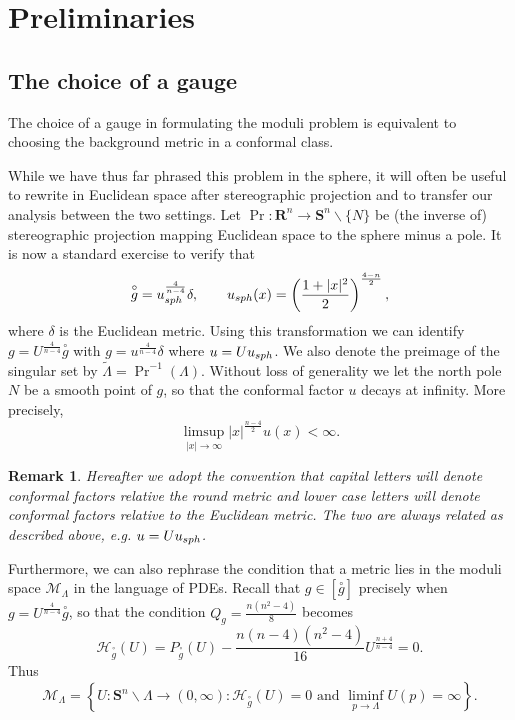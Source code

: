 \documentclass[reqno,11pt]{amsart}
\newtheorem{remark}[theorem]{Remark}
\theoremstyle{tttheorem}
\newcommand{\Ss}{\mathbf{S}}
\newcommand{\R}{\mathbf{R}}
\begin{document}
\section{Preliminaries} \label{sec:prelim} 

\subsection{The choice of a gauge} \label{sec:reformulations} 

The choice of a gauge in formulating the moduli problem is 
equivalent to choosing the background metric in a conformal 
class. 

While we have thus far phrased this problem in the sphere, it will 
often be useful to rewrite in Euclidean space after stereographic 
projection and to transfer our analysis between the two settings. 
Let $\operatorname{Pr}: \R^n \rightarrow \Ss^n \backslash \{ N \}$ 
be (the inverse of) stereographic projection mapping Euclidean space 
to the sphere minus a pole. It is now a standard exercise to verify 
that 
$$\overset{\circ}{g} = u_{\rm sph}^{\frac{4}{n-4}} \delta, \qquad 
u_{\rm sph} (x) = \left ( \frac{1+|x|^2}{2} \right )^{\frac{4-n}{2}}, $$
where $\delta$ is the Euclidean metric. Using this transformation we can 
identify $g = U^{\frac{4}{n-4}} \overset{\circ}{g}$ with $g= u^{\frac{4}{n-4}} \delta$
where $u = U u_{\rm sph}$. We also denote the preimage of the singular 
set by $\widetilde \Lambda = \operatorname{Pr}^{-1} (\Lambda)$. Without 
loss of generality we let the north pole $N$ be a smooth point of $g$, 
so that the conformal factor $u$ decays at infinity. More precisely, 
$$\limsup_{|x| \rightarrow \infty} |x|^{\frac{n-4}{2}} u(x) < \infty.$$

\begin{remark} 
Hereafter we adopt the convention that capital letters will 
denote conformal factors relative the round metric and lower case 
letters will denote conformal factors relative to the Euclidean 
metric. The two are always related as described above, {\it e.g.} 
$u=U u_{\rm sph}$. 
\end{remark}

Furthermore, we can also rephrase the condition that a metric 
lies in the moduli space $\mathcal{M}_\Lambda$ in the language of 
PDEs. Recall that $g \in [ \overset{\circ}{g}]$ precisely when 
$g = U^{\frac{4}{n-4}} \overset{\circ}{g}$, so that the condition 
$Q_g = \frac{n(n^2-4)}{8}$ becomes 
$$ \mathcal{H}_{\overset{\circ}{g}} (U) = P_{\overset{\circ}{g}}(U) 
- \frac{n(n-4)(n^2-4)}{16} U^{\frac{n+4}{n-4}}=0.$$
Thus 
$$\mathcal{M}_\Lambda = \left \{ U : \Ss^n \backslash \Lambda \rightarrow (0,\infty) : 
\mathcal{H}_{\overset{\circ}{g}} (U) = 0 \mbox{ and } \liminf_{p \rightarrow \Lambda} U(p) 
= \infty \right \}.  $$
\end{document}
